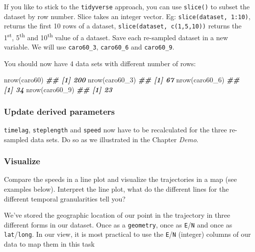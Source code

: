 \documentclass[
]{book}
\newenvironment{Shaded}{\begin{snugshade}}{\end{snugshade}}
\newcommand{\DocumentationTok}[1]{\textcolor[rgb]{0.56,0.35,0.01}{\textbf{\textit{#1}}}}
\newcommand{\FunctionTok}[1]{\textcolor[rgb]{0.00,0.00,0.00}{#1}}
\newcommand{\NormalTok}[1]{#1}
\begin{document}
If you like to stick to the \texttt{tidyverse} approach, you can use \texttt{slice()} to subset the dataset by row number. Slice takes an integer vector. Eg: \texttt{slice(dataset,\ 1:10)}, returns the first 10 rows of a dataset, \texttt{slice(dataset,\ c(1,5,10))} returns the 1\textsuperscript{st}, 5\textsuperscript{th} and 10\textsuperscript{th} value of a dataset. Save each re-sampled dataset in a new variable. We will use \texttt{caro60\_3}, \texttt{caro60\_6} and \texttt{caro60\_9}.

You should now have 4 data sets with different number of rows:

\begin{Shaded}
\begin{Highlighting}[]
\FunctionTok{nrow}\NormalTok{(caro60)}
\DocumentationTok{\#\# [1] 200}
\FunctionTok{nrow}\NormalTok{(caro60\_3)}
\DocumentationTok{\#\# [1] 67}
\FunctionTok{nrow}\NormalTok{(caro60\_6)}
\DocumentationTok{\#\# [1] 34}
\FunctionTok{nrow}\NormalTok{(caro60\_9)}
\DocumentationTok{\#\# [1] 23}
\end{Highlighting}
\end{Shaded}

\hypertarget{update-derived-parameters}{%
\subsubsection{Update derived parameters}\label{update-derived-parameters}}

\texttt{timelag}, \texttt{steplength} and \texttt{speed} now have to be recalculated for the three re-sampled data sets. Do so as we illustrated in the Chapter \emph{Demo}.

\hypertarget{visualize}{%
\subsubsection{Visualize}\label{visualize}}

Compare the speeds in a line plot and visualize the trajectories in a map (see examples below). Interpret the line plot, what do the different lines for the different temporal granularities tell you?

We've stored the geographic location of our point in the trajectory in three different forms in our dataset. Once as a \texttt{geometry}, once as \texttt{E}/\texttt{N} and once as \texttt{lat}/\texttt{long}. In our view, it is most practical to use the \texttt{E}/\texttt{N} (integer) columns of our data to map them in this task
\end{document}

